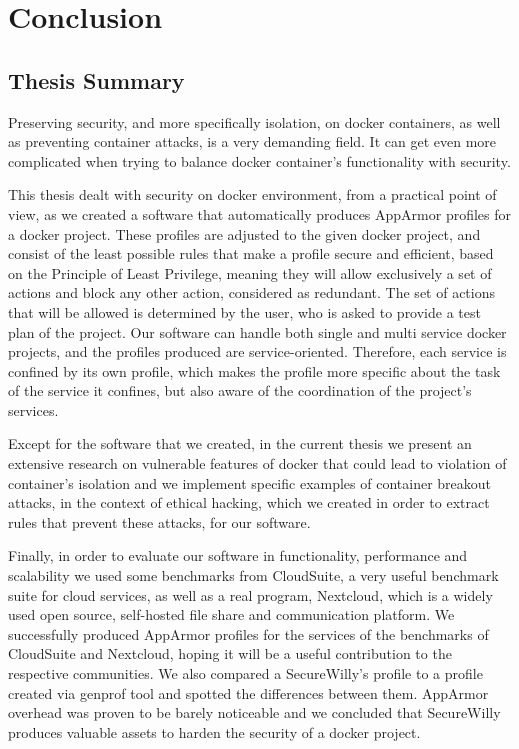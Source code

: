 \chapter{Conclusion}

\section{Thesis Summary}

Preserving security, and more specifically isolation, on docker containers, as well as preventing container attacks, is a very demanding field. It can get even more complicated when trying to balance docker container's functionality with security.

This thesis dealt with security on docker environment, from a practical point of view, as we created a software that automatically produces AppArmor profiles for a docker project. These profiles are adjusted to the given docker project, and consist of the least possible rules that make a profile secure and efficient, based on the Principle of Least Privilege, meaning they will allow exclusively a set of actions and block any other action, considered as redundant. The set of actions that will be allowed is determined by the user, who is asked to provide a test plan of the project. Our software can handle both single and multi service docker projects, and the profiles produced are service-oriented. Therefore, each service is confined by its own profile, which makes the profile more specific about the task of the service it confines, but also aware of the coordination of the project's services.

Except for the software that we created, in the current thesis we present an extensive research on vulnerable features of docker that could lead to violation of container's isolation and we implement specific examples of container breakout attacks, in the context of ethical hacking, which we created in order to extract rules that prevent these attacks, for our software.

Finally, in order to evaluate our software in functionality, performance and scalability we used some benchmarks from CloudSuite, a very useful benchmark suite for cloud services, as well as a real program, Nextcloud, which is a widely used open source, self-hosted file share and communication platform. We successfully produced AppArmor profiles for the services of the benchmarks of CloudSuite and Nextcloud, hoping it will be a useful contribution to the respective communities. We also compared a SecureWilly's profile to a profile created via genprof tool and spotted the differences between them. AppArmor overhead was proven to be barely noticeable and we concluded that SecureWilly produces valuable assets to harden the security of a docker project.

